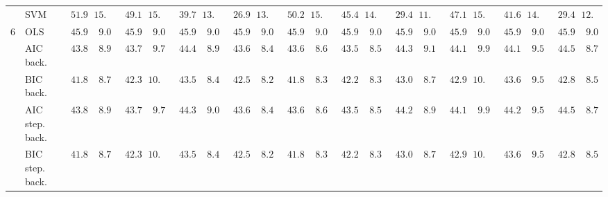 \begin{tabular}{llllllllllllllllllllll}
	& SVM  & $\phantom{0}51.927$ & $15.388$ & $\phantom{0}49.173$ & $15.338$ & $\phantom{0}39.745$ & $13.980$ & $\phantom{0}26.920$ & $13.226$ & $\phantom{0}50.239$ & $15.211$ & $\phantom{0}45.480$ & $14.164$ & $\phantom{0}29.461$ & $11.979$ & $\phantom{0}47.105$ & $15.030$ & $\phantom{0}41.676$ & $14.355$ & $\phantom{0}29.467$ & $12.088$ \\
	6 & OLS  & $\phantom{0}45.930$ & $\phantom{0}9.030$ & $\phantom{0}45.930$ & $\phantom{0}9.030$ & $\phantom{0}45.930$ & $\phantom{0}9.030$ & $\phantom{0}45.930$ & $\phantom{0}9.030$ & $\phantom{0}45.930$ & $\phantom{0}9.030$ & $\phantom{0}45.930$ & $\phantom{0}9.030$ & $\phantom{0}45.930$ & $\phantom{0}9.030$ & $\phantom{0}45.930$ & $\phantom{0}9.030$ & $\phantom{0}45.930$ & $\phantom{0}9.030$ & $\phantom{0}45.930$ & $\phantom{0}9.030$ \\
	& AIC back.  & $\phantom{0}43.855$ & $\phantom{0}8.957$ & $\phantom{0}43.726$ & $\phantom{0}9.793$ & $\phantom{0}44.453$ & $\phantom{0}8.971$ & $\phantom{0}43.642$ & $\phantom{0}8.470$ & $\phantom{0}43.673$ & $\phantom{0}8.613$ & $\phantom{0}43.511$ & $\phantom{0}8.525$ & $\phantom{0}44.354$ & $\phantom{0}9.128$ & $\phantom{0}44.198$ & $\phantom{0}9.994$ & $\phantom{0}44.186$ & $\phantom{0}9.546$ & $\phantom{0}44.524$ & $\phantom{0}8.705$ \\
	& BIC back.  & $\phantom{0}41.889$ & $\phantom{0}8.759$ & $\phantom{0}42.304$ & $10.004$ & $\phantom{0}43.509$ & $\phantom{0}8.456$ & $\phantom{0}42.592$ & $\phantom{0}8.259$ & $\phantom{0}41.802$ & $\phantom{0}8.347$ & $\phantom{0}42.247$ & $\phantom{0}8.367$ & $\phantom{0}43.046$ & $\phantom{0}8.756$ & $\phantom{0}42.950$ & $10.291$ & $\phantom{0}43.663$ & $\phantom{0}9.560$ & $\phantom{0}42.854$ & $\phantom{0}8.570$ \\
	& AIC step. back.  & $\phantom{0}43.855$ & $\phantom{0}8.957$ & $\phantom{0}43.726$ & $\phantom{0}9.793$ & $\phantom{0}44.381$ & $\phantom{0}9.026$ & $\phantom{0}43.642$ & $\phantom{0}8.470$ & $\phantom{0}43.673$ & $\phantom{0}8.613$ & $\phantom{0}43.541$ & $\phantom{0}8.548$ & $\phantom{0}44.288$ & $\phantom{0}8.998$ & $\phantom{0}44.198$ & $\phantom{0}9.994$ & $\phantom{0}44.267$ & $\phantom{0}9.500$ & $\phantom{0}44.524$ & $\phantom{0}8.705$ \\
	& BIC step. back.  & $\phantom{0}41.889$ & $\phantom{0}8.759$ & $\phantom{0}42.304$ & $10.004$ & $\phantom{0}43.509$ & $\phantom{0}8.456$ & $\phantom{0}42.596$ & $\phantom{0}8.265$ & $\phantom{0}41.802$ & $\phantom{0}8.347$ & $\phantom{0}42.272$ & $\phantom{0}8.359$ & $\phantom{0}43.046$ & $\phantom{0}8.756$ & $\phantom{0}42.950$ & $10.291$ & $\phantom{0}43.663$ & $\phantom{0}9.560$ & $\phantom{0}42.854$ & $\phantom{0}8.570$ \\

\end{tabular}
